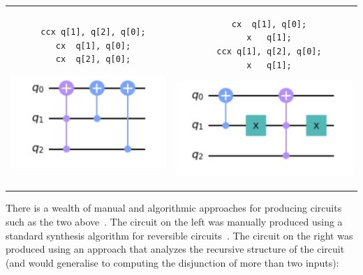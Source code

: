 \medskip
\begin{tabular}{c@{\qquad}c}
\begin{minipage}[t]{0.42\linewidth}
  \begin{verbatim}
  ccx q[1], q[2], q[0];
  cx  q[1], q[0];
  cx  q[2], q[0];
  \end{verbatim}
  \includegraphics[scale=0.7]{reversibleOr.png}
  \end{minipage}
&
\begin{minipage}[t]{0.43\linewidth}
  \begin{verbatim}
  cx  q[1], q[0];
  x   q[1];
  ccx q[1], q[2], q[0];
  x   q[1];
  \end{verbatim}
  \includegraphics[scale=0.6]{reversibleOr2.png}
  \end{minipage}
\end{tabular}

\medskip

There is a wealth of manual and algorithmic approaches for producing circuits such
as the two above~\cite{maslov:2003:rls:1087512,1201583}. The circuit on the left
was manually produced using a standard synthesis algorithm for reversible
circuits~\cite{10.1145/775832.775915}. The circuit on the right was produced
using an approach that analyzes the recursive structure of the circuit (and
would generalise to computing the disjunction of more than two inputs):

